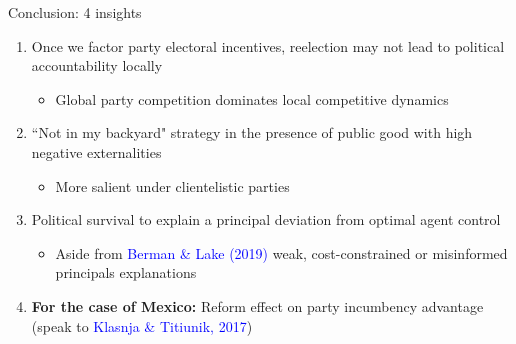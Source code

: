 \documentclass{beamer}
\begin{document}
\begin{frame}[label=main_insights]{Conclusion: 4 insights}

\begin{enumerate}
 		  \setlength\itemsep{1em}
	\item Once we factor party electoral incentives, reelection may not lead to political accountability locally
	\begin{itemize}
		\item Global party competition dominates local competitive dynamics
	\end{itemize}
	\item ``Not in my backyard" strategy in the presence of public good with high negative externalities
	\begin{itemize}
		\item More salient under clientelistic parties
	\end{itemize}

	\item Political survival to explain a principal deviation from optimal agent control
		\begin{itemize}
		\item Aside from \textcolor{blue}{Berman \& Lake (2019)} weak, cost-constrained or misinformed principals explanations
		\end{itemize}
\pause		

	\item \textbf{For the case of Mexico:} Reform effect on party incumbency advantage (speak to \textcolor{blue}{Klasnja \& Titiunik, 2017})

\end{enumerate}	

\end{frame}

\end{document}
